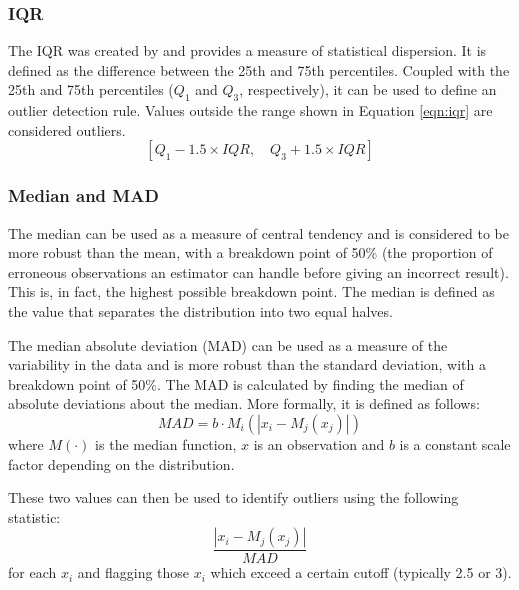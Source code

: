 \documentclass[11pt]{report}
\begin{document}

\subsubsection{IQR} \label{iqr}

The IQR was created by \cite{tukey1977iqr} and provides a measure of statistical dispersion. It is defined as the difference between the 25th and 75th percentiles. Coupled with the 25th and 75th percentiles ($Q_1$ and $Q_3$, respectively), it can be used to define an outlier detection rule. Values outside the range shown in Equation \ref{eqn:iqr} are considered outliers.
\begin{equation} \label{eqn:iqr}
[ Q_1 - 1.5 \times IQR, \quad Q_3 + 1.5 \times IQR]
\end{equation}

\subsubsection{Median and MAD} \label{mad}

The median can be used as a measure of central tendency and is considered to be more robust than the mean, with a breakdown point of 50\% (the proportion of erroneous observations an estimator can handle before giving an incorrect result). This is, in fact, the highest possible breakdown point. The median is defined as the value that separates the distribution into two equal halves.

The median absolute deviation (MAD) can be used as a measure of the variability in the data and is more robust than the standard deviation, with a breakdown point of 50\%. The MAD is calculated by finding the median of absolute deviations about the median. More formally, it is defined as follows:
\begin{equation}
MAD = b \cdot M_i (| x_i - M_j (x_j) |)
\end{equation}
where $M(\cdot)$ is the median function, $x$ is an observation and $b$ is a constant scale factor depending on the distribution.


These two values can then be used to identify outliers using the following statistic:
\begin{equation} \label{eqn:mad}
\frac{| x_i - M_j(x_j) |}{MAD}
\end{equation}
for each $x_i$ and flagging those $x_i$ which exceed a certain cutoff (typically 2.5 or 3).
\end{document}
